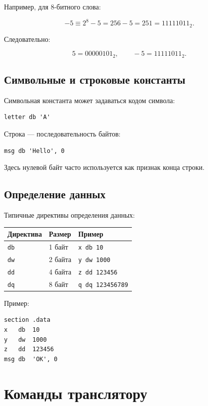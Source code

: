 \documentclass[12pt,a4paper]{article}
\begin{document}
Например, для 8-битного слова:

\[
-5 \equiv 2^8 - 5 = 256 - 5 = 251 = 11111011_2.
\]

Следовательно:

\[
5 = 00000101_2,
\qquad
-5 = 11111011_2.
\]

\subsection{Символьные и строковые константы}

Символьная константа может задаваться кодом символа:

\begin{lstlisting}
letter db 'A'
\end{lstlisting}

Строка --- последовательность байтов:

\begin{lstlisting}
msg db 'Hello', 0
\end{lstlisting}

Здесь нулевой байт часто используется как признак конца строки.

\subsection{Определение данных}

Типичные директивы определения данных:

\begin{center}
\begin{tabular}{lll}
\toprule
Директива & Размер & Пример \\
\midrule
\texttt{db} & 1 байт & \texttt{x db 10} \\
\texttt{dw} & 2 байта & \texttt{y dw 1000} \\
\texttt{dd} & 4 байта & \texttt{z dd 123456} \\
\texttt{dq} & 8 байт & \texttt{q dq 123456789} \\
\bottomrule
\end{tabular}
\end{center}

Пример:

\begin{lstlisting}
section .data
x   db  10
y   dw  1000
z   dd  123456
msg db  'OK', 0
\end{lstlisting}

\section{Команды транслятору}
\end{document}
